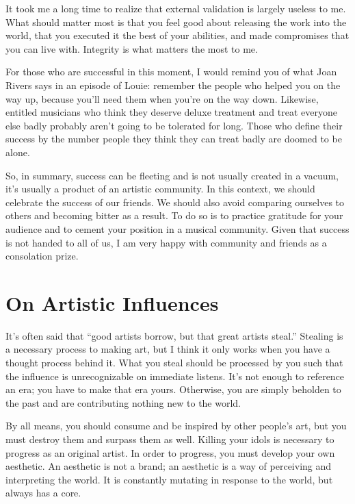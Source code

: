\documentclass[
]{book}
\begin{document}
It took me a long time to realize that external validation is largely useless to me. What should matter most is that you feel good about releasing the work into the world, that you executed it the best of your abilities, and made compromises that you can live with. Integrity is what matters the most to me.

For those who are successful in this moment, I would remind you of what Joan Rivers says in an episode of Louie: remember the people who helped you on the way up, because you'll need them when you're on the way down. Likewise, entitled musicians who think they deserve deluxe treatment and treat everyone else badly probably aren't going to be tolerated for long. Those who define their success by the number people they think they can treat badly are doomed to be alone.

So, in summary, success can be fleeting and is not usually created in a vacuum, it's usually a product of an artistic community. In this context, we should celebrate the success of our friends. We should also avoid comparing ourselves to others and becoming bitter as a result. To do so is to practice gratitude for your audience and to cement your position in a musical community. Given that success is not handed to all of us, I am very happy with community and friends as a consolation prize.

\hypertarget{on-artistic-influences}{%
\chapter{On Artistic Influences}\label{on-artistic-influences}}

It's often said that ``good artists borrow, but that great artists steal.'' Stealing is a necessary process to making art, but I think it only works when you have a thought process behind it. What you steal should be processed by you such that the influence is unrecognizable on immediate listens. It's not enough to reference an era; you have to make that era yours. Otherwise, you are simply beholden to the past and are contributing nothing new to the world.

By all means, you should consume and be inspired by other people's art, but you must destroy them and surpass them as well. Killing your idols is necessary to progress as an original artist. In order to progress, you must develop your own aesthetic. An aesthetic is not a brand; an aesthetic is a way of perceiving and interpreting the world. It is constantly mutating in response to the world, but always has a core.
\end{document}
